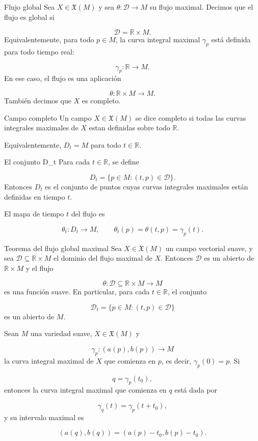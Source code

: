 \begin{bookdefinition}{Flujo global}
Sea $X\in\mathfrak X(M)$ y sea $\theta:\mathcal D\to M$ su flujo maximal. Decimos que el flujo es global si

\[
\mathcal D=\mathbb R\times M.
\]
Equivalentemente, para todo $p\in M$, la curva integral maximal $\gamma_p$ está definida para todo tiempo real:

\[
\gamma_p:\mathbb R\to M.
\]
En ese caso, el flujo es una aplicación

\[
\theta:\mathbb R\times M\to M.
\]
También decimos que $X$ es completo.

\end{bookdefinition}
\begin{bookdefinition}{Campo completo}
Un campo $X\in\mathfrak X(M)$ se dice completo si todas las curvas integrales maximales de $X$ estan definidas sobre todo $\mathbb R$.

Equivalentemente, $D_t=M$ para todo $t\in\mathbb R$.

\end{bookdefinition}
\begin{bookdefinition}{El conjunto D\_t}
Para cada $t\in\mathbb R$, se define

\[
D_t=\{p\in M:(t,p)\in\mathcal D\}.
\]
Entonces $D_t$ es el conjunto de puntos cuyas curvas integrales maximales están definidas en tiempo $t$.

El mapa de tiempo $t$ del flujo es

\[
\theta_t:D_t\to M,\qquad \theta_t(p)=\theta(t,p)=\gamma_p(t).
\]
\end{bookdefinition}
\begin{booktheorem}{Teorema del flujo global maximal}
Sea $X\in\mathfrak X(M)$ un campo vectorial suave, y sea $\mathcal D\subseteq\mathbb R\times M$ el dominio del flujo maximal de $X$. Entonces $\mathcal D$ es un abierto de $\mathbb R\times M$ y el flujo

\[
\theta:\mathcal D\subseteq\mathbb R\times M\to M
\]
es una función suave. En particular, para cada $t\in\mathbb R$, el conjunto

\[
\mathcal D_t=\{p\in M:(t,p)\in\mathcal D\}
\]
es un abierto de $M$.

\end{booktheorem}
\label{blk:aab78f}
\begin{bookremark}{}
Sean $M$ una variedad suave, $X\in\mathfrak{X}(M)$ y

\[
\gamma_p:(a(p),b(p))\longrightarrow M
\]
la curva integral maximal de $X$ que comienza en $p$, es decir, $\gamma_p(0)=p$. Si

\[
q=\gamma_p(t_0),
\]
entonces la curva integral maximal que comienza en $q$ está dada por

\[
\gamma_q(t)=\gamma_p(t+t_0),
\]
y su intervalo maximal es

\[
(a(q),b(q))=(a(p)-t_0,b(p)-t_0).
\]
\end{bookremark}
